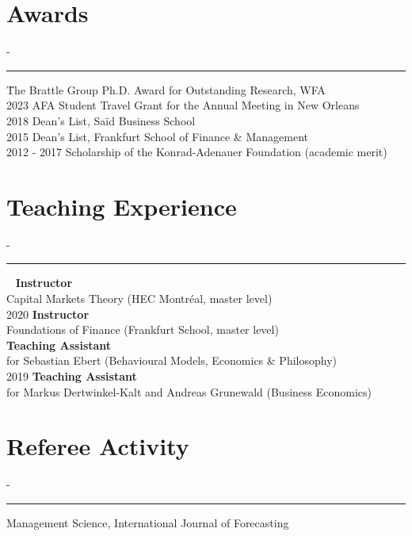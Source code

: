\documentclass{res}
\newcommand{\sectionline}{	\vspace{-8pt}
	{\parindent-\sectionwidth \rule{\resumewidth}{0.4pt}} }
\newenvironment{nstabbing}
  {\setlength{\topsep}{-\parskip}%
   \setlength{\partopsep}{0pt}%
   \tabbing}
  {\endtabbing}
\begin{document}
\begin{resume}
\section{Awards} 	
	\sectionline
	\vspace{-3ex}
    \begin{nstabbing}
    2024 \qquad \qquad \qquad \= The Brattle Group Ph.D. Award for Outstanding Research, WFA \\[0.5ex]
    2023 \> AFA Student Travel Grant for the Annual Meeting in New Orleans \\[0.5ex]
    2018 \> Dean's List, Sa\"{i}d Business School \\[0.5ex]
    2015 \> Dean's List, Frankfurt School of Finance \& Management \\[0.5ex]
    2012 - 2017 \> Scholarship of the Konrad-Adenauer Foundation (academic merit)
    \end{nstabbing}

\section{Teaching Experience}
	\sectionline
	\vspace{-3ex}
    \begin{nstabbing}
    2025 ~ \qquad \quad \= \textbf{Instructor} \\
		\> Capital Markets Theory (HEC Montréal, master level)  \\[0.5ex]
    2020  \> \textbf{Instructor} \\
				\> Foundations of Finance (Frankfurt School, master level)  \\[0.5ex]
    \> \textbf{Teaching Assistant}\\
					\> for Sebastian Ebert (Behavioural Models, Economics \& Philosophy) \\[0.5ex]
    2019 \> \textbf{Teaching Assistant} \\
				\> for Markus Dertwinkel-Kalt and Andreas Grunewald (Business Economics)  \\[0.5ex]
    \end{nstabbing}

\section{Referee Activity}
\sectionline
\vspace{-3ex}
\begin{nstabbing}
	Management Science, International Journal of Forecasting
\end{nstabbing}


\end{resume}
\end{document}
